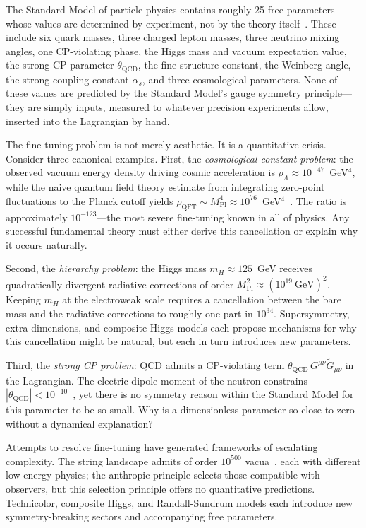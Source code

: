 \documentclass[aps,prd,twocolumn,superscriptaddress,longbibliography,nofootinbib]{revtex4-2}
\begin{document}
The Standard Model of particle physics contains roughly 25 free
parameters whose values are determined by experiment, not by the
theory itself~\cite{PDG2024}.  These include six quark masses, three
charged lepton masses, three neutrino mixing angles, one CP-violating
phase, the Higgs mass and vacuum expectation value, the strong CP
parameter $\theta_{\mathrm{QCD}}$, the fine-structure constant, the
Weinberg angle, the strong coupling constant $\alpha_s$, and three
cosmological parameters.  None of these values are predicted by the
Standard Model's gauge symmetry principle---they are simply inputs,
measured to whatever precision experiments allow, inserted into the
Lagrangian by hand.

The fine-tuning problem is not merely aesthetic.  It is a quantitative
crisis.  Consider three canonical examples.  First, the
\textit{cosmological constant problem}: the observed vacuum energy
density driving cosmic acceleration is $\rho_\Lambda \approx
10^{-47}$~GeV$^4$, while the naive quantum field theory estimate
from integrating zero-point fluctuations to the Planck cutoff yields
$\rho_{\mathrm{QFT}} \sim M_{\mathrm{Pl}}^4 \approx
10^{76}$~GeV$^4$~\cite{Weinberg1989}.  The ratio is approximately
$10^{-123}$---the most severe fine-tuning known in all of physics.
Any successful fundamental theory must either derive this cancellation
or explain why it occurs naturally.

Second, the \textit{hierarchy problem}: the Higgs mass $m_H \approx
125$~GeV receives quadratically divergent radiative corrections of
order $M_{\mathrm{Pl}}^2 \approx (10^{19}~\text{GeV})^2$.  Keeping
$m_H$ at the electroweak scale requires a cancellation between the
bare mass and the radiative corrections to roughly one part in
$10^{34}$.  Supersymmetry, extra dimensions, and composite Higgs
models each propose mechanisms for why this cancellation might be
natural, but each in turn introduces new parameters.

Third, the \textit{strong CP problem}: QCD admits a CP-violating term
$\theta_{\mathrm{QCD}}\, G^{\mu\nu}\tilde{G}_{\mu\nu}$ in the
Lagrangian.  The electric dipole moment of the neutron constrains
$|\theta_{\mathrm{QCD}}| < 10^{-10}$~\cite{PDG2024}, yet there is no
symmetry reason within the Standard Model for this parameter to be so
small.  Why is a dimensionless parameter so close to zero without a
dynamical explanation?

Attempts to resolve fine-tuning have generated frameworks of
escalating complexity.  The string landscape admits of order
$10^{500}$ vacua~\cite{Bousso2000}, each with different low-energy
physics; the anthropic principle selects those compatible with
observers, but this selection principle offers no quantitative
predictions.  Technicolor, composite Higgs, and Randall-Sundrum
models each introduce new symmetry-breaking sectors and accompanying
free parameters.
\end{document}
